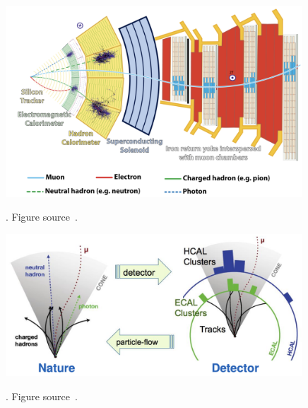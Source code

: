 \begin{figure}[t!]
\centering
\includegraphics[width=0.99\textwidth]{figures/particles_signture_in_detector.png}
\caption[particles_signture_in_detector]{}. Figure source~\cite{SMtable}.                                                                        
\label{fig:Particles_in_CMS}                                                                                                               
\end{figure}

\begin{figure}[t!]
\centering
\includegraphics[width=0.99\textwidth]{figures/PF.png}
\caption[how PF translate detector info]{}. Figure source~\cite{SMtable}.                                                                        
\label{fig:PF_diagram}                                                                                                               
\end{figure}

